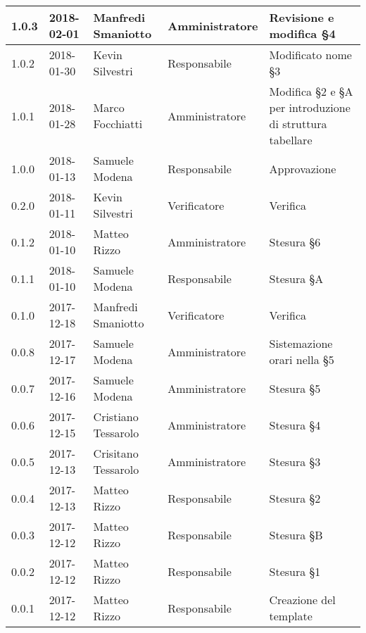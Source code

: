 \documentclass[./PianodiProgetto.tex]{subfiles}
\begin{document}
\begin{longtable}{|p{20mm}|p{20mm}|p{40mm}|p{30mm}|p{50mm}|}
		\hline 1.0.3 & 2018-02-01 & Manfredi Smaniotto & Amministratore & Revisione e modifica §4 \\
		
		\hline 1.0.2 & 2018-01-30 & Kevin Silvestri & Responsabile & Modificato nome §3 \\
		
		\hline 1.0.1 & 2018-01-28 & Marco Focchiatti & Amministratore & Modifica §2 e §A per introduzione di struttura tabellare \\
	
		\hline 1.0.0 & 2018-01-13 & Samuele Modena & Responsabile & Approvazione \\
 
		\hline 0.2.0 & 2018-01-11 & Kevin Silvestri & Verificatore & Verifica \\
 
		\hline 0.1.2 & 2018-01-10 & Matteo Rizzo & Amministratore & Stesura §6 \\
 
		\hline 0.1.1 & 2018-01-10 & Samuele Modena & Responsabile & Stesura §A \\
 
		\hline 0.1.0 & 2017-12-18 & Manfredi Smaniotto & Verificatore & Verifica \\
 		
 		\hline 0.0.8 & 2017-12-17 & Samuele Modena & Amministratore & Sistemazione orari nella §5 \\
 		
		\hline 0.0.7 & 2017-12-16 & Samuele Modena & Amministratore & Stesura §5 \\
 
		\hline 0.0.6 & 2017-12-15 & Cristiano Tessarolo & Amministratore & Stesura §4 \\
 
		\hline 0.0.5 & 2017-12-13 & Crisitano Tessarolo & Amministratore & Stesura §3 \\
 
		\hline 0.0.4 & 2017-12-13 & Matteo Rizzo & Responsabile & Stesura §2 \\
 
 		\hline 0.0.3 & 2017-12-12 & Matteo Rizzo & Responsabile & Stesura §B \\
 		
		\hline 0.0.2 & 2017-12-12 & Matteo Rizzo & Responsabile & Stesura §1 \\
 
 		\hline 0.0.1 & 2017-12-12 & Matteo Rizzo & Responsabile & Creazione del template \\
 
		\hline
 
	\end{longtable}
\end{document}
